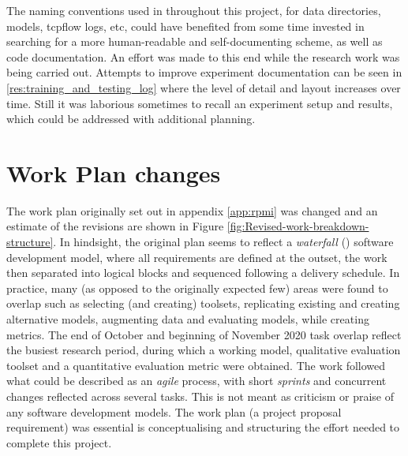 
The naming conventions used in throughout this project, for data directories, models, tcpflow logs, etc, could have benefited from some time invested in searching for a more human-readable and self-documenting scheme, as well as code documentation. An effort was made to this end while the research work was being carried out. Attempts to improve experiment documentation can be seen in \ref{res:training_and_testing_log} where the level of detail and layout increases over time. Still it was laborious sometimes to recall an experiment setup and results, which could be addressed with additional planning.


\section{Work Plan changes}
The work plan originally set out in appendix \ref{app:rpmi} was changed and an estimate of the revisions are shown in Figure \ref{fig:Revised-work-breakdown-structure}. In hindsight, the original plan seems to reflect a \textit{waterfall} (\cite{balaji2012waterfall}) software development model, where all requirements are defined at the outset, the work then separated into logical blocks and sequenced following a delivery schedule. In practice, many (as opposed to the originally expected few) areas were found to overlap such as selecting (and creating) toolsets, replicating existing and creating alternative models, augmenting data and evaluating models, while creating metrics. The end of October and beginning of November 2020 task overlap reflect the busiest research period, during which a working model, qualitative evaluation toolset and a quantitative evaluation metric were obtained. The work followed what could be described as an \textit{agile} process, with short \textit{sprints} and concurrent changes reflected across several tasks. This is not meant as criticism or praise of any software development models. The work plan (a project proposal requirement) was essential is conceptualising and structuring the effort needed to complete this project.

